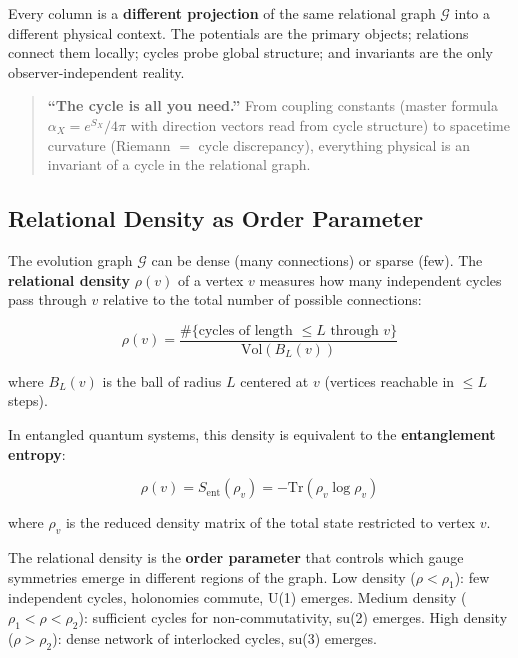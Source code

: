 Every column is a \textbf{different projection} of the same relational graph $\mathcal{G}$ into a different physical context. The potentials are the primary objects; relations connect them locally; cycles probe global structure; and invariants are the only observer-independent reality.

\begin{quote}
\textbf{``The cycle is all you need.''} From coupling constants (master formula $\alpha_X = e^{S_X}/4\pi$ with direction vectors read from cycle structure) to spacetime curvature (Riemann $=$ cycle discrepancy), everything physical is an invariant of a cycle in the relational graph.
\end{quote}

\subsection{Relational Density as Order Parameter}\label{sec:relational_density}

The evolution graph $\mathcal{G}$ can be dense (many connections) or sparse (few). The \textbf{relational density} $\rho(v)$ of a vertex $v$ measures how many independent cycles pass through $v$ relative to the total number of possible connections:

\begin{equation}
\rho(v) = \frac{\#\{\text{cycles of length $\leq L$ through } v\}}{\text{Vol}(B_L(v))}
\end{equation}

where $B_L(v)$ is the ball of radius $L$ centered at $v$ (vertices reachable in $\leq L$ steps).

In entangled quantum systems, this density is equivalent to the \textbf{entanglement entropy}:

\begin{equation}
\rho(v) = S_{\mathrm{ent}}(\rho_v) = -\mathrm{Tr}(\rho_v \log \rho_v)
\end{equation}

where $\rho_v$ is the reduced density matrix of the total state restricted to vertex $v$.

The relational density is the \textbf{order parameter} that controls which gauge symmetries emerge in different regions of the graph. Low density ($\rho < \rho_1$): few independent cycles, holonomies commute, U(1) emerges. Medium density ($\rho_1 < \rho < \rho_2$): sufficient cycles for non-commutativity, su(2) emerges. High density ($\rho > \rho_2$): dense network of interlocked cycles, su(3) emerges.

